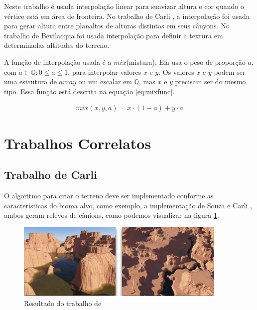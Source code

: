 Neste trabalho é usada interpolação linear para suavizar altura e cor quando
o vértice está em área de fronteira. No trabalho de Carli \cite{carli2012canion}, a interpolação 
foi usada para gerar altura entre planaltos de alturas distintas em seus cânyons. No 
trabalho de Bevilacqua \cite{fernando2009costas} foi usada interpolação para definir a textura 
em  determinadas altitudes do terreno.

A função de interpolação usada é a $mix$(mistura). Ela usa o peso de proporção $a$, 
com $a \in \mathbb{Q}: 0 \leq a \leq 1$, para interpolar valores $x$ e $y$. Os valores $x$ e $y$
podem ser uma estrutura de $array$ ou um escalar em $\mathbb{Q}$, mas $x$ e $y$ precisam ser do mesmo tipo.
Essa função está descrita na equação \ref{eq:mixfunc}.

\begin{equation}\label{eq:mixfunc}
  \begin{split}
    mix(x, y, a) = x \cdot (1 - a) + y \cdot a
  \end{split}
\end{equation}

\section{Trabalhos Correlatos}
\subsection{Trabalho de Carli}
O algoritmo para criar o terreno deve ser implementado conforme as
características do bioma alvo, como exemplo, a implementação de Souza
\cite{gabrielle2016canion} e Carli \cite{carli2012canion}, ambos geram relevos de
cânions, como podemos visualizar na figura \ref{fig:carli2012result}.
\begin{figure}[H]
    \centering
    \includegraphics[width=0.9\textwidth]{figuras/carli2012result.png}
    \caption{Resultado do trabalho de \cite{carli2012canion}}
    \label{fig:carli2012result}
\end{figure}

